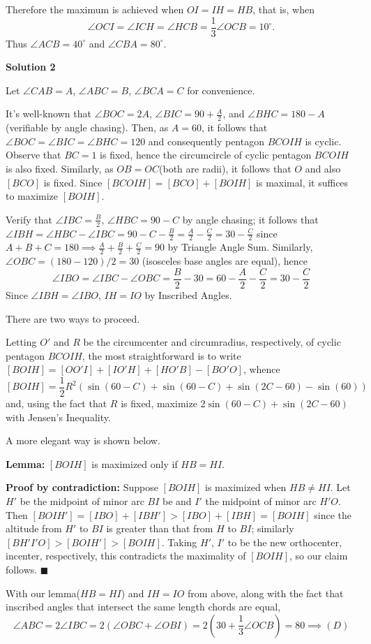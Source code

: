 \begin{enumerate}
 Therefore the maximum is achieved when $OI=IH=HB$, that is, when 
 \[\angle OCI = \angle ICH = \angle HCB = \frac 13 \angle OCB = 10^\circ.\]Thus $\angle ACB = 40^\circ$ and $\angle CBA = 80^\circ$.

 



\textbf{Solution 2}

Let $\angle CAB=A$, $\angle ABC=B$, $\angle BCA=C$ for convenience.

 It's well-known that $\angle BOC=2A$, $\angle BIC=90+\frac{A}{2}$, and $\angle BHC=180-A$ (verifiable by angle chasing). Then, as $A=60$, it follows that $\angle BOC=\angle BIC=\angle BHC=120$ and consequently pentagon $BCOIH$ is cyclic. Observe that $BC=1$ is fixed, hence the circumcircle of cyclic pentagon $BCOIH$ is also fixed. Similarly, as $OB=OC$(both are radii), it follows that $O$ and also $[BCO]$ is fixed. Since $[BCOIH]=[BCO]+[BOIH]$ is maximal, it suffices to maximize $[BOIH]$.

 Verify that $\angle IBC=\frac{B}{2}$, $\angle HBC=90-C$ by angle chasing; it follows that $\angle IBH=\angle HBC-\angle IBC=90-C-\frac{B}{2}=\frac{A}{2}-\frac{C}{2}=30-\frac{C}{2}$ since $A+B+C=180\implies\frac{A}{2}+\frac{B}{2}+\frac{C}{2}=90$ by Triangle Angle Sum. Similarly, $\angle OBC=(180-120)/2=30$ (isosceles base angles are equal), hence 
 \[\angle IBO=\angle IBC-\angle OBC=\frac{B}{2}-30=60-\frac{A}{2}-\frac{C}{2}=30-\frac{C}{2}\] Since  $\angle IBH=\angle IBO$,  $IH=IO$ by Inscribed Angles.

 There are two ways to proceed. 

 
Letting $O'$ and $R$ be the circumcenter and circumradius, respectively, of cyclic pentagon $BCOIH$, the most straightforward is to write $[BOIH]=[OO'I]+[IO'H]+[HO'B]-[BO'O]$, whence 
 \[[BOIH]=\frac{1}{2}R^2(\sin(60-C)+\sin(60-C)+\sin(2C-60)-\sin(60))\] and, using the fact that $R$ is fixed, maximize $2\sin(60-C)+\sin(2C-60)$ with Jensen's Inequality. 

 
A more elegant way is shown below.

 \textbf{Lemma:} $[BOIH]$ is maximized only if $HB=HI$.

 \textbf{Proof by contradiction:} Suppose $[BOIH]$ is maximized when $HB\neq HI$. Let $H'$ be the midpoint of minor arc $BI$ be and $I'$ the midpoint of minor arc $H'O$. Then $[BOIH']=[IBO]+[IBH']>[IBO]+[IBH]=[BOIH]$ since the altitude from $H'$ to $BI$ is greater than that from $H$ to $BI$; similarly $[BH'I'O]>[BOIH']>[BOIH]$. Taking $H'$, $I'$ to be the new orthocenter, incenter, respectively, this contradicts the maximality of $[BOIH]$, so our claim follows. $\blacksquare$

 With our lemma($HB=HI$) and $IH=IO$ from above, along with the fact that inscribed angles that intersect the same length chords are equal,
 \[\angle ABC=2\angle IBC=2(\angle OBC+\angle OBI)=2(30+\frac{1}{3}\angle OCB)=80\implies\boxed{(D)}\]



\end{enumerate}